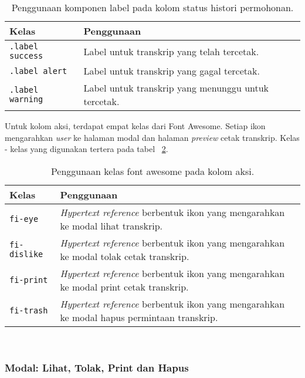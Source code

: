 \begin{table}[H]
	\centering
	\caption{Penggunaan komponen label pada kolom status histori permohonan.}
	\begin{tabularx}{\textwidth}{lX}
		\toprule
		Kelas     & Penggunaan \\
		\midrule
		\texttt{.label success} & Label untuk transkrip yang telah tercetak.\\
		\texttt{.label alert} & Label untuk transkrip yang gagal tercetak.\\
		\texttt{.label warning} & Label untuk transkrip yang menunggu untuk tercetak.\\		
		\bottomrule
	\end{tabularx}%
	\label{table:analisisLabelManajemenCetakTranskrip}
\end{table}%


\noindent Untuk kolom aksi, terdapat empat kelas dari Font Awesome. Setiap ikon mengarahkan \textit{user} ke halaman modal dan halaman \textit{preview} cetak transkrip. Kelas - kelas yang digunakan tertera pada tabel ~\ref{table:analisisFontAwesomeManajemenCetakTranskrip}.\\

\begin{table}[H]
	\centering
	\caption{Penggunaan kelas font awesome pada kolom aksi.}
	\begin{tabularx}{\textwidth}{lX}
		\toprule
		Kelas     & Penggunaan \\
		\midrule
		\texttt{fi-eye} & \textit{Hypertext reference} berbentuk ikon yang mengarahkan ke modal lihat transkrip.\\
		\texttt{fi-dislike} & \textit{Hypertext reference} berbentuk ikon yang mengarahkan ke modal tolak cetak transkrip.\\
		\texttt{fi-print} & \textit{Hypertext reference} berbentuk ikon yang mengarahkan ke modal print cetak transkrip.\\
		\texttt{fi-trash} & \textit{Hypertext reference} berbentuk ikon yang mengarahkan ke modal hapus permintaan transkrip.\\
		\bottomrule
	\end{tabularx}%
	\label{table:analisisFontAwesomeManajemenCetakTranskrip}
\end{table} \\

\subsubsection{Modal: Lihat, Tolak, Print dan Hapus}

